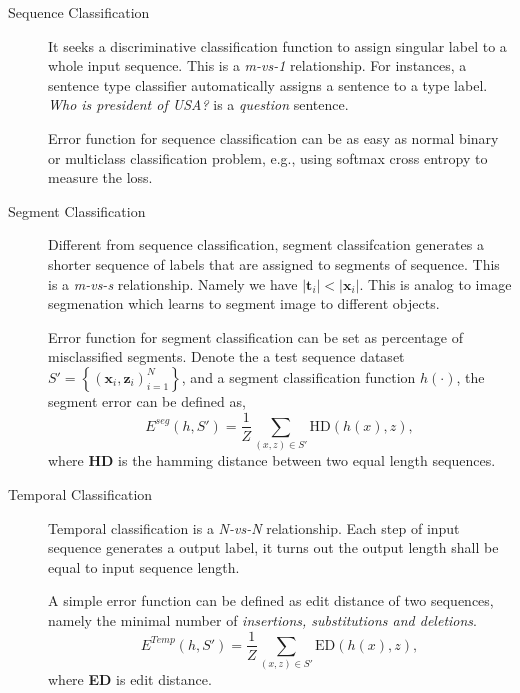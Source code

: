 \documentclass{article}
\newcommand{\vct}[1]{\ensuremath{\boldsymbol{#1}}} %
\begin{document}
\begin{description}
	\item[Sequence Classification] 
	It seeks a discriminative classification function to assign 
	singular label to a whole input sequence. This is a \textit{m-vs-1} relationship.
	For instances, a sentence type classifier automatically assigns a sentence to a type
	label. \textit{Who is president of USA?} is a \textit{question} sentence. 

	Error function for sequence classification can be as easy as normal binary or multiclass
	classification problem, e.g., using softmax cross entropy to measure the loss. 
	
	\item[Segment Classification] 
	Different from sequence classification, segment classifcation generates a shorter sequence 
	of labels that are assigned to segments of sequence. This is a \textit{m-vs-s} relationship.
	Namely we have $ | \vct t_i | < | \vct x_i |$. This is analog to image segmenation which 
	learns to segment image to different objects.
	
	Error function for segment classification can be set as percentage of misclassified segments.
	Denote the a test sequence dataset $S' = \left\lbrace (\vct x_i, \vct z_i)_{i=1}^N \right\rbrace$,
	and a segment classification function $h(\cdot)$, the segment error can be defined as, 
	\[
		E^{seg}(h, S') = \frac{1}{Z}\sum_{(x,z)\in S'} \text{HD}(h(x), z),
	\]
	where \textbf{HD} is the hamming distance between two equal length sequences.

	\item[Temporal Classification] 
	Temporal classification is a \textit{N-vs-N} relationship. Each step of input sequence 
	generates a output label, it turns out the output length shall be equal to input sequence
	length. 

	A simple error function can be defined as edit distance of two sequences, namely the minimal
	number of \textit{insertions, substitutions and deletions}. 
	\[
		E^{Temp}(h, S') = \frac{1}{Z}\sum_{(x,z)\in S'} \text{ED}(h(x), z),
	\]
	where \textbf{ED} is edit distance. 

\end{description}






\end{document}
